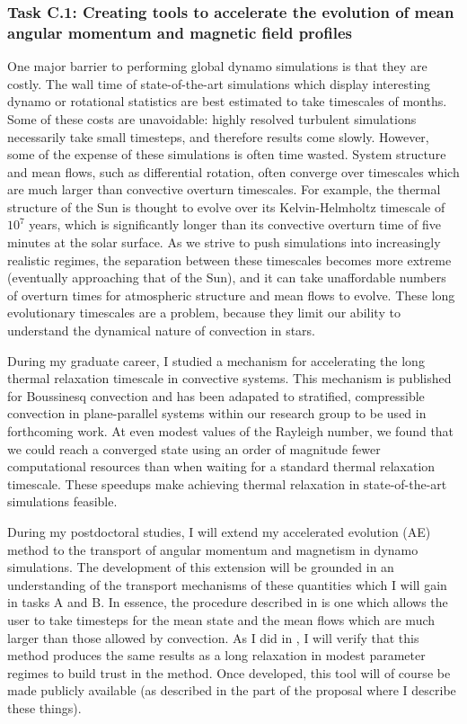 \documentclass[aasms,12pt]{article}
\begin{document}
\subsubsection{Task C.1: Creating tools to accelerate the evolution of mean angular momentum and magnetic field profiles}
One major barrier to performing global dynamo simulations is that they are costly.
The wall time of state-of-the-art simulations which display interesting dynamo or rotational statistics are best estimated to take timescales of months.
Some of these costs are unavoidable: highly resolved turbulent simulations necessarily take small timesteps, and therefore results come slowly.
However, some of the expense of these simulations is often time wasted.
System structure and mean flows, such as differential rotation, often converge over timescales which are much larger than convective overturn timescales.
For example, the thermal structure of the Sun is thought to evolve over its Kelvin-Helmholtz timescale of $10^7$ years, which is significantly longer than its convective overturn time of five minutes at the solar surface.
As we strive to push simulations into increasingly realistic regimes, the separation between these timescales becomes more extreme (eventually approaching that of the Sun), and it can take unaffordable numbers of overturn times for atmospheric structure and mean flows to evolve.
These long evolutionary timescales are a problem, because they limit our ability to understand the dynamical nature of convection in stars.

During my graduate career, I studied a mechanism for accelerating the long thermal relaxation timescale in convective systems.
This mechanism is published for Boussinesq convection \citep{anders&all2018} and has been adapated to stratified, compressible convection in plane-parallel systems within our research group to be used in forthcoming work.
At even modest values of the Rayleigh number, we found that we could reach a converged state using an order of magnitude fewer computational resources than when waiting for a standard thermal relaxation timescale.
These speedups make achieving thermal relaxation in state-of-the-art simulations feasible.

During my postdoctoral studies, I will extend my accelerated evolution (AE) method to the transport of angular momentum and magnetism in dynamo simulations.
The development of this extension will be grounded in an understanding of the transport mechanisms of these quantities which I will gain in tasks A and B.
In essence, the procedure described in \citet{ander&all2018} is one which allows the user to take timesteps for the mean state and the mean flows which are much larger than those allowed by convection.
As I did in \citet{anders&all2018}, I will verify that this method produces the same results as a long relaxation in modest parameter regimes to build trust in the method.
Once developed, this tool will of course be made publicly available (as described in the part of the proposal where I describe these things).
\end{document}
